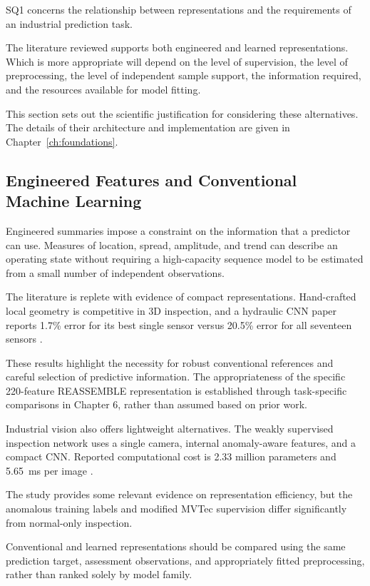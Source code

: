 SQ1 concerns the relationship between representations and the requirements of an industrial
prediction task.

The literature reviewed supports both engineered and learned representations. Which is more
appropriate will depend on the level of supervision, the level of preprocessing, the level of
independent sample support, the information required, and the resources available for model fitting.

This section sets out the scientific justification for considering these alternatives. The details
of their architecture and implementation are given in Chapter~\ref{ch:foundations}.

\subsection{Engineered Features and Conventional Machine Learning}

Engineered summaries impose a constraint on the information that a predictor can use. Measures of
location, spread, amplitude, and trend can describe an operating state without requiring a
high-capacity sequence model to be estimated from a small number of independent observations.

The literature is replete with evidence of compact representations. Hand-crafted local geometry is
competitive in 3D inspection, and a hydraulic CNN paper reports 1.7\% error for its best single
sensor versus 20.5\% error for all seventeen sensors \citep{Horwitz2023Back,Goodarzi2023Deep}.

These results highlight the necessity for robust conventional references and careful selection of
predictive information. The appropriateness of the specific 220-feature REASSEMBLE representation is
established through task-specific comparisons in Chapter 6, rather than assumed based on prior work.

Industrial vision also offers lightweight alternatives. The weakly supervised inspection network
uses a single camera, internal anomaly-aware features, and a compact CNN. Reported computational
cost is 2.33 million parameters and 5.65~ms per image \citep[PDF p.~10, Table~V]{P035}.

The study provides some relevant evidence on representation efficiency, but the anomalous training
labels and modified MVTec supervision differ significantly from normal-only inspection.

Conventional and learned representations should be compared using the same prediction target,
assessment observations, and appropriately fitted preprocessing, rather than ranked solely by model
family.

